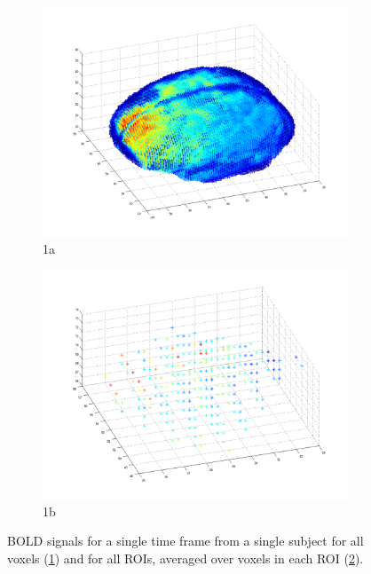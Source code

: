 \documentclass[11pt]{article}
\begin{document}
\begin{figure}[h!]
\begin{subfigure}{.5\textwidth}
  \centering
  \includegraphics[width=\linewidth]{eda1}
  \caption{1a}
  \label{fig:eda_all}
\end{subfigure}%
\begin{subfigure}{.5\textwidth}
  \centering
  \includegraphics[width=\linewidth]{eda2}
  \caption{1b}
  \label{fig:eda_ROIs}
\end{subfigure}
\caption{BOLD signals for a single time frame from a single subject for all
voxels (\ref{fig:eda_all}) and for all ROIs, averaged over voxels in each ROI
(\ref{fig:eda_ROIs}).}
\label{fig:eda}
\end{figure}
\end{document}
